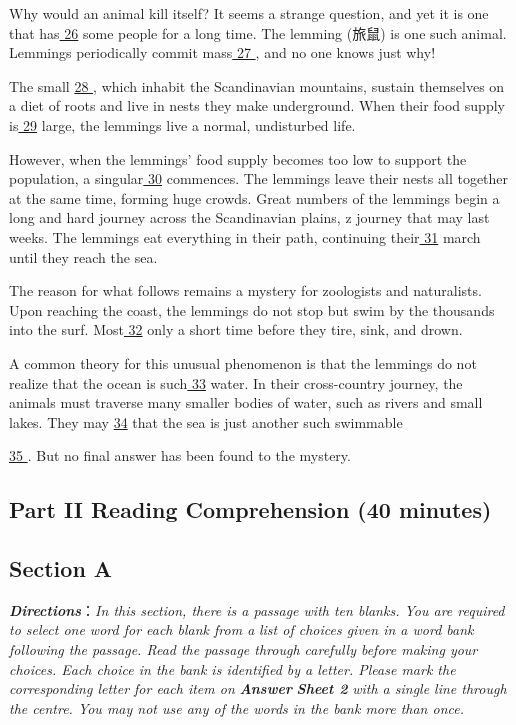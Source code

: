 \documentclass[UTF8,11pt]{ctexart}
\begin{document}
Why would an animal kill itself? It seems a strange question, and yet it is one that has\uline{ 26} some people for a long time. The lemming (旅鼠) is one such animal. Lemmings periodically commit mass\uline{ 27 }, and no one knows just why!


The small \uline{28 }, which inhabit the Scandinavian mountains, sustain themselves on a diet of roots and live in nests they make underground. When their food supply is\uline{ 29} large, the lemmings live a normal, undisturbed life.


However, when the lemmings' food supply becomes too low to support the population, a singular\uline{ 30} commences. The lemmings leave their nests all together at the same time, forming huge crowds. Great numbers of the lemmings begin a long and hard journey across the Scandinavian plains, z journey that may last weeks. The lemmings eat everything in their path, continuing their\uline{ 31} march until they reach the sea.


The reason for what follows remains a mystery for zoologists and naturalists. Upon reaching the coast, the lemmings do not stop but swim by the thousands into the surf. Most\uline{ 32} only a short time before they tire, sink, and drown.


A common theory for this unusual phenomenon is that the lemmings do not realize that the ocean is such\uline{ 33} water. In their cross-country journey, the animals must traverse many smaller bodies of water, such as rivers and small lakes. They may \uline{34} that the sea is just another such swimmable


\uline{35 }. But no final answer has been found to the mystery.


\subsection*{\textbf{Part} II \textbf{Reading Comprehension} \textbf{(40 minutes)}}


\subsection*{\textbf{Section A}}


\textbf{\textit{Directions}}：\textit{In this section, there is a passage with ten blanks. You are required to select one word for each blank from a} \textit{list of choices given in a word bank following the passage. Read the passage through carefully before making your} \textit{choices. Each choice in the bank is identified by a letter. Please mark the corresponding letter for each item on}\textbf{\textit{ Answer}} \textbf{\textit{Sheet 2}}\textit{ with a single line through the centre. You may not use any of the words in the bank more than once.}
\end{document}
